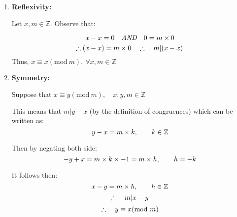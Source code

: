 \documentclass{article}
\numberwithin{equation}{subsection}
\begin{document}
	\vspace{10pt}
	\begin{enumerate}
		\item \textbf{Reflexivity:} 

			\vspace{5pt}
			\par{
				Let $x,m \in \mathbb{Z}$. Observe that:
		
			\begin{equation}\notag
				x-x=0 \quad \textit{AND} \quad 0=m\times0	
			\end{equation}
			\begin{equation}\notag
				\therefore (x-x) = m\times0 \quad \therefore \quad m | (x-x)
			\end{equation}
				Thus, $x\equiv x (\textrm{mod}\ m),\ \forall x,m \in \mathbb{Z}$
			}

	\newpage
		\item \textbf{Symmetry:} 
		
		\vspace{5pt}
		\par{
			Suppose that $x\equiv y(\textrm{mod}\ m), \quad x,y,m \in \mathbb{Z} $
		}

		\par{
			This means that $m|y-x$ (by the definition of congruences) which can be written as:
		}
		\begin{equation}\notag
			y-x = m\times k, \qquad k\in \mathbb{Z}	
		\end{equation}
		
		Then by negating both side:
		\begin{equation}\notag
			-y+x = m\times k \times -1 = m\times h,\qquad h=-k
		\end{equation}

		It follows then:
		\begin{equation}\notag
			x-y = m\times h, \qquad h\in \mathbb{Z}	
		\end{equation}
		\begin{equation}\notag
			\therefore \quad m|x-y	
		\end{equation}
		\begin{equation}\notag
			\therefore \quad y\equiv x(\textrm{mod}\ m)	
		\end{equation}


\end{enumerate}
\end{document}
